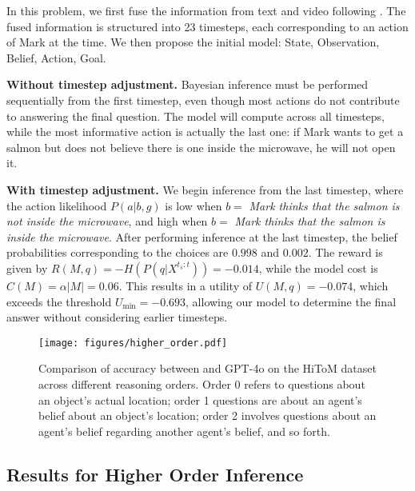 In this problem, we first fuse the information from text and video following \citet{jin2024mmtom}. The fused information is structured into 23 timesteps, each corresponding to an action of Mark at the time. We then propose the initial model: State, Observation, Belief, Action, Goal.

\textbf{Without timestep adjustment.} Bayesian inference must be performed sequentially from the first timestep, even though most actions do not contribute to answering the final question. The model will compute across all timesteps, while the most informative action is actually the last one: if Mark wants to get a salmon but does not believe there is one inside the microwave, he will not open it.

\textbf{With timestep adjustment.} We begin inference from the last timestep, 
where the action likelihood $P(a|b, g)$ is low when $b=$ \textit{Mark thinks that the salmon is not inside the microwave}, and high when $b=$ \textit{Mark thinks that the salmon is inside the microwave}. After performing inference at the last timestep, the belief probabilities corresponding to the choices are $0.998$ and $0.002$. The reward is given by $R(M,q)=-H(P(q | X^{t_s:t}))=-0.014$, while the model cost is $C(M)=\alpha|M|=0.06$. This results in a utility of $U(M, q)=-0.074$, which exceeds the threshold $U_{\text{min}}=-0.693$, allowing our model to determine the final answer without considering earlier timesteps.

\begin{figure}[t!]
  \centering
  \texttt{[image: figures/higher\_order.pdf]}
  \caption{Comparison of accuracy between \ours and GPT-4o on the HiToM dataset across different reasoning orders. Order 0 refers to questions about an object's actual location; order 1 questions are about an agent's belief about an object's location; order 2 involves questions about an agent's belief regarding another agent's belief, and so forth.}
  \label{fig:higher_order}
\end{figure}

\subsection{Results for Higher Order Inference}

